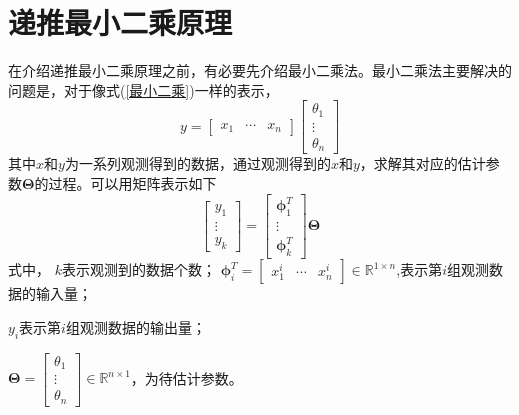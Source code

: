 \section{递推最小二乘原理}
在介绍递推最小二乘原理之前，有必要先介绍最小二乘法。最小二乘法主要解决的问题是，对于像式(\ref{最小二乘})一样的表示，
\begin{equation}
\label{最小二乘}
y=\left[\begin{matrix}
x_{1} & \cdots & x_{n}
\end{matrix}\right]\left[\begin{matrix}
\theta_{1} \\
\vdots \\
\theta_{n}
\end{matrix}\right]
\end{equation}
其中$x$和$y$为一系列观测得到的数据，通过观测得到的$x$和$y$，求解其对应的估计参数$\symbf{\Theta}$的过程。可以用矩阵表示如下
\begin{equation}
\left[\begin{matrix}
y_{1} \\
\vdots \\
y_{k}
\end{matrix}\right]=\left[\begin{matrix}
\symbf{\phi}_{1}^{T} \\
\vdots \\
\symbf{\phi}_{k}^{T}
\end{matrix}\right] \symbf{\Theta}
\end{equation}
式中，
$k$表示观测到的数据个数；
$\symbf{\phi}_{i}^{T}=\left[\begin{matrix}x_{1}^{i} & \cdots & x_{n}^{i}\end{matrix}\right] \in \mathbb{R}^{1 \times n}$,表示第$i$组观测数据的输入量；

$y_i$表示第$i$组观测数据的输出量；

$\symbf{\Theta}=\left[\begin{matrix}\theta_{1} \\ \vdots \\ \theta_{n}\end{matrix}\right] \in \mathbb{R}^{n \times 1}$，为待估计参数。

